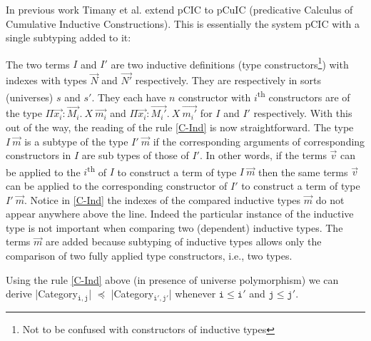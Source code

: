 \documentclass{easychair}
\begin{document}
In previous work Timany et al. \cite{DBLP:conf/ictac/Timany015} extend
pCIC to pCuIC (predicative Calculus of Cumulative Inductive
Constructions). This is essentially the system pCIC with a single
subtyping added to it:
\begin{mathpar}
\end{mathpar}
The two terms $I$ and $I'$ are two inductive definitions (type
constructors\footnote{Not to be confused with constructors of
  inductive types}) with indexes with types $\vec{N}$ and $\vec{N'}$
respectively. They are respectively in sorts (universes) $s$ and $s'$.
They each have $n$ constructor with $i$\textsuperscript{th}
constructors are of the type $\Pi\vec{x_i} : \vec{M_i}.~X~\vec{m_i}$
and $\Pi\vec{x_i} : \vec{M_i'}.~X~\vec{m_i'}$ for $I$ and $I'$
respectively. With this out of the way, the reading of the rule
\ref{C-Ind} is now straightforward. The type $I~\vec{m}$ is a subtype
of the type $I'~\vec{m}$ if the corresponding arguments of
corresponding constructors in $I$ are sub types of those of $I'$.  In
other words, if the terms $\vec{v}$ can be applied to the
$i$\textsuperscript{th} of $I$ to construct a term of type $I~\vec{m}$
then the same terms $\vec{v}$ can be applied to the corresponding
constructor of $I'$ to construct a term of type $I'~\vec{m}$.  Notice
in \ref{C-Ind} the indexes of the compared inductive types $\vec{m}$
do not appear anywhere above the line. Indeed the particular instance
of the inductive type is not important when comparing two (dependent)
inductive types. The terms $\vec{m}$ are added because subtyping of
inductive types allows only the comparison of two fully applied type
constructors, i.e., two types.

Using the rule \ref{C-Ind} above (in presence of universe polymorphism)
we can derive
\Coqe|Category$_{\mathtt{i, j}}$| $\preceq$ \Coqe|Category$_{\mathtt{i', j'}}$|
whenever $\mathtt{i \leq i'}$ and $\mathtt{j \leq j'}$.
\end{document}
